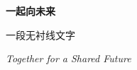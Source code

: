\documentclass{ctexart}
\begin{document}
  \textbf{一起向未来}

  {\sffamily
    一段无衬线文字
  }

  \emph{Together for a Shared Future}
\end{document}
